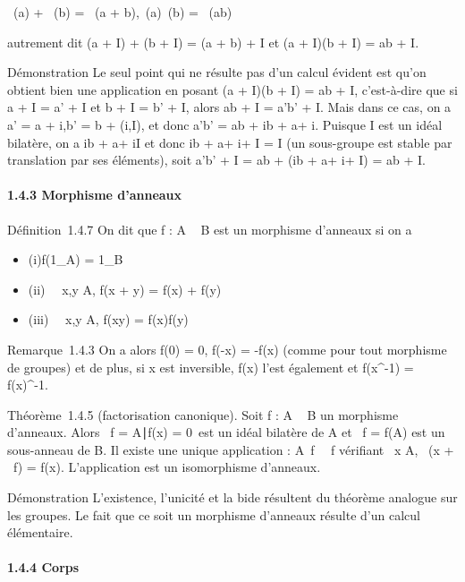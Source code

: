 \documentclass[]{article}
\begin{document}
\pi~(a) + \pi~(b) = \pi~(a + b),\quad \pi~(a)\pi~(b) = \pi~(ab)

autrement dit (a + I) + (b + I) = (a + b) + I et (a + I)(b + I) = ab +
I.

Démonstration Le seul point qui ne résulte pas d'un calcul évident est
qu'on obtient bien une application en posant (a + I)(b + I) = ab + I,
c'est-à-dire que si a + I = a' + I et b + I = b' + I, alors ab + I =
a'b' + I. Mais dans ce cas, on a a' = a + i,b' = b + \jmath (i,\jmath \in I), et
donc a'b' = ab + ib + a\jmath + i\jmath. Puisque I est un idéal bilatère, on a ib
+ a\jmath + i\jmath \in I et donc ib + a\jmath + i\jmath + I = I (un sous-groupe est stable
par translation par ses éléments), soit a'b' + I = ab + (ib + a\jmath + i\jmath +
I) = ab + I.

\paragraph{1.4.3 Morphisme d'anneaux}

Définition~1.4.7 On dit que f : A \rightarrow~ B est un morphisme d'anneaux si on a

\begin{itemize}
\itemsep1pt\parskip0pt
\item
  (i)f(1\_A) = 1\_B
\item
  (ii) \forall~~x,y \in A, f(x + y) = f(x) + f(y)
\item
  (iii) \forall~~x,y \in A, f(xy) = f(x)f(y)
\end{itemize}

Remarque~1.4.3 On a alors f(0) = 0, f(-x) = -f(x) (comme pour tout
morphisme de groupes) et de plus, si x est inversible, f(x) l'est
également et f(x^-1) = f(x)^-1.

Théorème~1.4.5 (factorisation canonique). Soit f : A \rightarrow~ B un morphisme
d'anneaux. Alors
\mathrmKer~f =
\x \in A∣f(x) =
0\ est un idéal bilatère de A et
\mathrmIm~f = f(A) est un
sous-anneau de B. Il existe une unique application
\overlinef :
A\diagup\mathrmKer~f
\rightarrow~\mathrmIm~f vérifiant
\forall~x \in A, \overlinef~(x
+ \mathrmKer~f) = f(x).
L'application \overlinef est un isomorphisme
d'anneaux.

Démonstration L'existence, l'unicité et la bi de
\overlinef résultent du théorème analogue sur les
groupes. Le fait que ce soit un morphisme d'anneaux résulte d'un calcul
élémentaire.

\paragraph{1.4.4 Corps}
\end{document}

